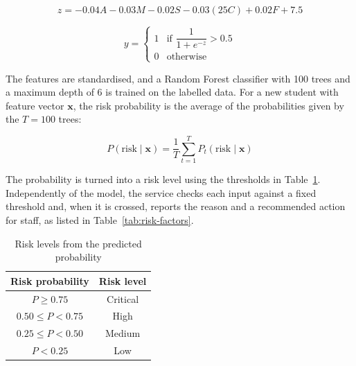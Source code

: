 \begin{equation} \label{eq:risk-logit}
    z = -0.04A - 0.03M - 0.02S - 0.03(25C) + 0.02F + 7.5
\end{equation}

\begin{equation} \label{eq:risk-label}
    y = \begin{cases} 1 & \text{if } \dfrac{1}{1+e^{-z}} > 0.5 \\ 0 & \text{otherwise} \end{cases}
\end{equation}

The features are standardised, and a Random Forest classifier with 100 trees and a maximum depth of 6 is trained on the labelled data. For a new student with feature vector $\mathbf{x}$, the risk probability is the average of the probabilities given by the $T=100$ trees:

\begin{equation} \label{eq:rf}
    P(\text{risk} \mid \mathbf{x}) = \frac{1}{T}\sum_{t=1}^{T} P_t(\text{risk} \mid \mathbf{x})
\end{equation}

The probability is turned into a risk level using the thresholds in Table~\ref{tab:risk-levels}. Independently of the model, the service checks each input against a fixed threshold and, when it is crossed, reports the reason and a recommended action for staff, as listed in Table~\ref{tab:risk-factors}.

\begin{table}[H]
    \centering
        \caption{Risk levels from the predicted probability}
        \label{tab:risk-levels}
        \begin{tabular}{|c|c|}
        \hline
        \textbf{Risk probability} & \textbf{Risk level}\\
        \hline
        $P \geq 0.75$ & Critical \\
        \hline
        $0.50 \leq P < 0.75$ & High \\
        \hline
        $0.25 \leq P < 0.50$ & Medium \\
        \hline
        $P < 0.25$ & Low \\
        \hline
        \end{tabular}
\end{table}

